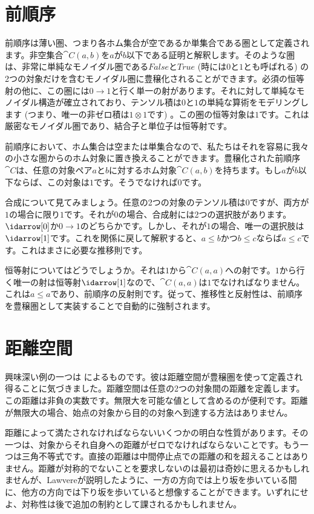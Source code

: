 \section{前順序}

前順序は薄い圏、つまり各ホム集合が空であるか単集合である圏として定義されます。非空集合$\cat{C}(a, b)$を$a$が$b$以下である証明と解釈します。そのような圏は、非常に単純なモノイダル圏である$\mathit{False}$と$\mathit{True}$ (時には$0$と$1$とも呼ばれる) の2つの対象だけを含むモノイダル圏に豊穣化されることができます。必須の恒等射の他に、この圏には$0 \to 1$と行く単一の射があります。それに対して単純なモノイダル構造が確立されており、テンソル積は$0$と$1$の単純な算術をモデリングします (つまり、唯一の非ゼロ積は$1 \otimes 1$です) 。この圏の恒等対象は$1$です。これは厳密なモノイダル圏であり、結合子と単位子は恒等射です。

前順序において、ホム集合は空または単集合なので、私たちはそれを容易に我々の小さな圏からのホム対象に置き換えることができます。豊穣化された前順序$\cat{C}$は、任意の対象ペア$a$と$b$に対するホム対象$\cat{C}(a, b)$を持ちます。もし$a$が$b$以下ならば、この対象は$1$です。そうでなければ$0$です。

合成について見てみましょう。任意の2つの対象のテンソル積は$0$ですが、両方が$1$の場合に限り$1$です。それが$0$の場合、合成射には2つの選択肢があります。$\idarrow[0]$か$0 \to 1$のどちらかです。しかし、それが$1$の場合、唯一の選択肢は$\idarrow[1]$です。これを関係に戻して解釈すると、$a \leqslant b$かつ$b \leqslant c$ならば$a \leqslant c$です。これはまさに必要な推移則です。

恒等射についてはどうでしょうか。それは$1$から$\cat{C}(a, a)$への射です。$1$から行く唯一の射は恒等射$\idarrow[1]$なので、$\cat{C}(a, a)$は$1$でなければなりません。これは$a \leqslant a$であり、前順序の反射則です。従って、推移性と反射性は、前順序を豊穣圏として実装することで自動的に強制されます。

\section{距離空間}

興味深い例の一つは
によるものです。彼は距離空間が豊穣圏を使って定義され得ることに気づきました。距離空間は任意の2つの対象間の距離を定義します。この距離は非負の実数です。無限大を可能な値として含めるのが便利です。距離が無限大の場合、始点の対象から目的の対象へ到達する方法はありません。

距離によって満たされなければならないいくつかの明白な性質があります。その一つは、対象からそれ自身への距離がゼロでなければならないことです。もう一つは三角不等式です。直接の距離は中間停止点での距離の和を超えることはありません。距離が対称的でないことを要求しないのは最初は奇妙に思えるかもしれませんが、Lawvereが説明したように、一方の方向では上り坂を歩いている間に、他方の方向では下り坂を歩いていると想像することができます。いずれにせよ、対称性は後で追加の制約として課されるかもしれません。


